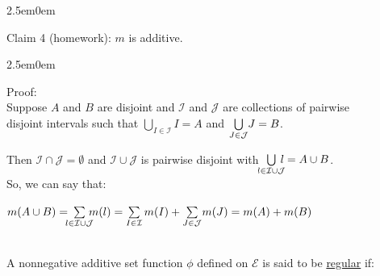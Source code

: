 \documentclass{book}
\newcommand{\exTwo}{%
   \color{RedViolet}%
   \fontsize{13}{15}\selectfont%
}
\newenvironment{myIndent}{%
   \begin{adjustwidth}{2.5em}{0em}%
}{%
   \end{adjustwidth}%
}
\newcommand{\udefine}[1]{{%
   \setulcolor{Red}%
   \setul{0.14em}{0.07em}%
   \ul{#1}%
}}
\newcommand{\mySepTwo}[1][.]{%
   {\noindent\color{#1}{\rule{6.5in}{0.5mm}}}\\%
}
\newcommand{\retTwo}{\hfill\bigbreak}
\begin{document}
{\begin{myIndent}
   Claim 4 (homework): $m$ is additive.
   {\begin{myIndent}\exTwo
      Proof:\\
      Suppose $A$ and $B$ are disjoint and $\mathcal{I}$ and $\mathcal{J}$ are collections of pairwise\\ disjoint intervals such that $\bigcup\limits_{I \in \mathcal{I}}I = A$ and  $\bigcup\limits_{J \in \mathcal{J}}\hspace{-0.2em}J = B$.\retTwo

      Then $\mathcal{I} \cap \mathcal{J} = \emptyset$ and $\mathcal{I} \cup \mathcal{J}$ is pairwise disjoint with $\hspace{-0.5em}\bigcup\limits_{l \in \mathcal{I}\cup\mathcal{J}}\hspace{-0.6em}l = A\cup B$.\\ [-8pt] So, we can say that:

      {\centering $m(A \cup B) = \hspace{-0.5em}\sum\limits_{l \in \mathcal{I}\cup\mathcal{J}}\hspace{-0.6em}m(l) = \sum\limits_{I \in \mathcal{I}}m(I) + \sum\limits_{J \in \mathcal{J}}\hspace{-0.15em}m(J) = m(A) + m(B)$ \retTwo\par}
   \end{myIndent}}
\end{myIndent}}

\mySepTwo

A nonnegative additive set function $\phi$ defined on $\mathcal{E}$ is said to be \udefine{regular} if:
\end{document}
